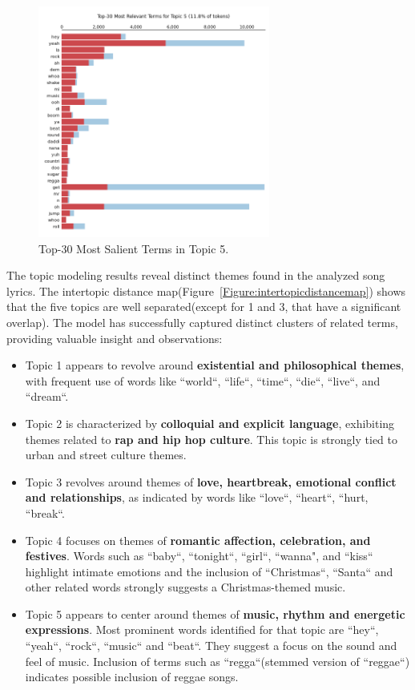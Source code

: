 \begin{center}
\begin{figure}[H]
  \centering
  \includegraphics[width=3in]{img/topics/png/t5.png}
  \caption{Top-30 Most Salient Terms in Topic 5.}
  \label{Figure:fig_eh}
\end{figure}
\end{center}


The topic modeling results reveal distinct themes found in the analyzed song
lyrics. The intertopic distance map(Figure~\ref{Figure:intertopicdistancemap}) shows
that the five topics are well separated(except for 1 and 3, that have a
significant overlap). The model has successfully captured distinct clusters of
related terms, providing valuable insight and observations:

\begin{itemize}
    \item Topic 1 appears to revolve around \textbf{existential and philosophical
      themes}, with frequent use of words like ``world``, ``life``, ``time``,
      ``die``, ``live``, and ``dream``.
    \item Topic 2 is characterized by \textbf{colloquial and explicit
      language}, exhibiting themes related to \textbf{rap and hip hop culture}.
      This topic is strongly tied to urban and street culture themes.
    \item Topic 3 revolves around themes of \textbf{love, heartbreak, emotional
      conflict and relationships}, as indicated by words like ``love``,
      ``heart``, ``hurt, ``break``.
    \item Topic 4 focuses on themes of \textbf{romantic affection, celebration,
      and festives}. Words such as ``baby``, ``tonight``, ``girl``, ``wanna",
      and ``kiss`` highlight intimate emotions and the inclusion of
      ``Christmas``, ``Santa`` and other related words strongly suggests a
      Christmas-themed music.
    \item Topic 5 appears to center around themes of \textbf{music, rhythm and
      energetic expressions}. Most prominent words identified for that topic
      are ``hey``, ``yeah``, ``rock``, ``music`` and ``beat``. They suggest a
      focus on the sound and feel of music. Inclusion of terms such as
      ``regga``(stemmed version of ``reggae``) indicates possible inclusion of
      reggae songs.
\end{itemize}

